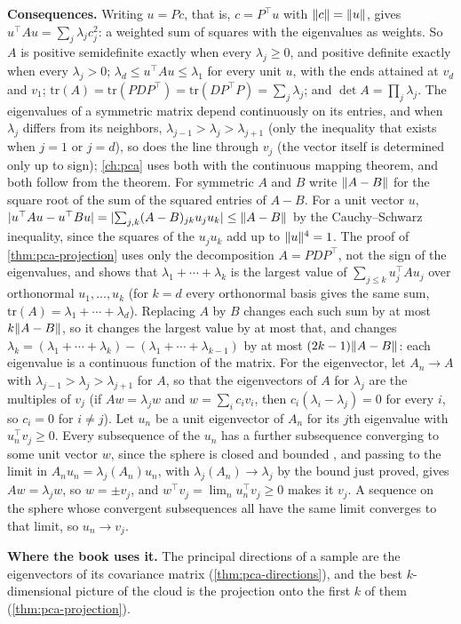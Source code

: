 \textbf{Consequences.} Writing $u = Pc$, that is, $c = P^\top u$ with $\lVert c\rVert = \lVert u\rVert$, gives $u^\top Au = \sum_j\lambda_jc_j^2$: a weighted sum of squares with the eigenvalues as weights.
So $A$ is positive semidefinite exactly when every $\lambda_j \geq 0$, and positive definite exactly when every $\lambda_j > 0$; $\lambda_d \leq u^\top Au \leq \lambda_1$ for every unit $u$, with the ends attained at $v_d$ and $v_1$; $\mathrm{tr}(A) = \mathrm{tr}(PDP^\top) = \mathrm{tr}(DP^\top P) = \sum_j\lambda_j$; and $\det A = \prod_j\lambda_j$.
The eigenvalues of a symmetric matrix depend continuously on its entries, and when $\lambda_j$ differs from its neighbors, $\lambda_{j-1} > \lambda_j > \lambda_{j+1}$ (only the inequality that exists when $j = 1$ or $j = d$), so does the line through $v_j$ (the vector itself is determined only up to sign); \cref{ch:pca} uses both with the continuous mapping theorem, and both follow from the theorem.
For symmetric $A$ and $B$ write $\lVert A - B\rVert$ for the square root of the sum of the squared entries of $A - B$.
For a unit vector $u$, $\lvert u^\top Au - u^\top Bu\rvert = \lvert\sum_{j,k}(A - B)_{jk}u_ju_k\rvert \leq \lVert A - B\rVert$ by the Cauchy--Schwarz inequality, since the squares of the $u_ju_k$ add up to $\lVert u\rVert^4 = 1$.
The proof of \cref{thm:pca-projection} uses only the decomposition $A = PDP^\top$, not the sign of the eigenvalues, and shows that $\lambda_1 + \cdots + \lambda_k$ is the largest value of $\sum_{j \leq k}u_j^\top Au_j$ over orthonormal $u_1, \ldots, u_k$ (for $k = d$ every orthonormal basis gives the same sum, $\mathrm{tr}(A) = \lambda_1 + \cdots + \lambda_d$).
Replacing $A$ by $B$ changes each such sum by at most $k\lVert A - B\rVert$, so it changes the largest value by at most that, and changes $\lambda_k = (\lambda_1 + \cdots + \lambda_k) - (\lambda_1 + \cdots + \lambda_{k-1})$ by at most $(2k - 1)\lVert A - B\rVert$: each eigenvalue is a continuous function of the matrix.
For the eigenvector, let $A_n \to A$ with $\lambda_{j-1} > \lambda_j > \lambda_{j+1}$ for $A$, so that the eigenvectors of $A$ for $\lambda_j$ are the multiples of $v_j$ (if $Aw = \lambda_jw$ and $w = \sum_ic_iv_i$, then $c_i(\lambda_i - \lambda_j) = 0$ for every $i$, so $c_i = 0$ for $i \neq j$).
Let $u_n$ be a unit eigenvector of $A_n$ for its $j$th eigenvalue with $u_n^\top v_j \geq 0$.
Every subsequence of the $u_n$ has a further subsequence converging to some unit vector $w$, since the sphere is closed and bounded , and passing to the limit in $A_nu_n = \lambda_j(A_n)u_n$, with $\lambda_j(A_n) \to \lambda_j$ by the bound just proved, gives $Aw = \lambda_jw$, so $w = \pm v_j$, and $w^\top v_j = \lim_n u_n^\top v_j \geq 0$ makes it $v_j$.
A sequence on the sphere whose convergent subsequences all have the same limit converges to that limit, so $u_n \to v_j$.

\textbf{Where the book uses it.} The principal directions of a sample are the eigenvectors of its covariance matrix (\cref{thm:pca-directions}), and the best $k$-dimensional picture of the cloud is the projection onto the first $k$ of them (\cref{thm:pca-projection}).
